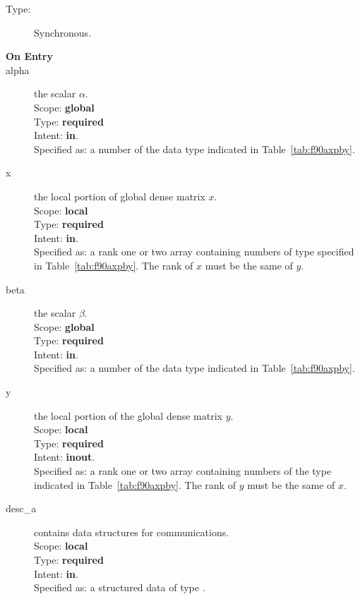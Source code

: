 \begin{description}
\item[Type:] Synchronous.
\item[\bf On Entry]
\item[alpha] the scalar $\alpha$.\\
Scope: {\bf global} \\
Type: {\bf required} \\
Intent: {\bf in}.\\
Specified as: a number of the data type indicated in Table~\ref{tab:f90axpby}.
\item[x] the local portion of global dense matrix
$x$.\\
Scope: {\bf local} \\
Type: {\bf required} \\
Intent: {\bf in}.\\
Specified as: a rank one or two array 
containing numbers of type 
specified in Table~\ref{tab:f90axpby}.  The rank of $x$ must be the same of $y$. 
\item[beta] the scalar $\beta$.\\
Scope: {\bf global} \\
Type: {\bf required} \\
Intent: {\bf in}.\\
Specified as: a number of the data type indicated in Table~\ref{tab:f90axpby}.
\item[y] the local portion of the global dense matrix
$y$. \\
Scope: {\bf local} \\
Type: {\bf required} \\
Intent: {\bf inout}.\\
Specified as:  a rank one or two array containing numbers of the type 
indicated in Table~\ref{tab:f90axpby}.  The rank of $y$ must be the same of $x$. 
\item[desc\_a] contains data structures for communications.\\
Scope: {\bf local} \\
Type: {\bf required}\\
Intent: {\bf in}.\\
Specified as: a structured data of type \descdata.

\end{description}
